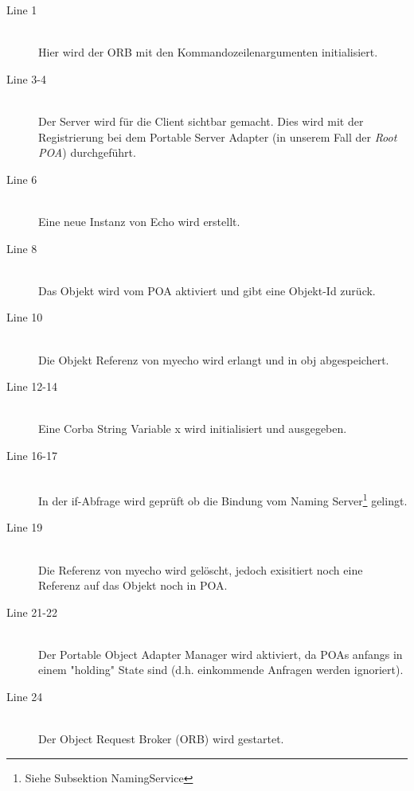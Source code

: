 \documentclass[11pt]{article}
\begin{document}
\begin{description}

\item[Line 1] \hfill \\
Hier wird der ORB mit den Kommandozeilenargumenten initialisiert.

\item[Line 3-4] \hfill \\
Der Server wird für die Client sichtbar gemacht. Dies wird mit der Registrierung bei dem Portable Server Adapter (in unserem Fall der \textit{Root POA}) durchgeführt.

\item[Line 6] \hfill \\
Eine neue Instanz von Echo wird erstellt.

\item[Line 8] \hfill \\
Das Objekt wird vom POA aktiviert und gibt eine Objekt-Id zurück.

\item[Line 10] \hfill \\
Die Objekt Referenz von myecho wird erlangt und in obj abgespeichert.

\item[Line 12-14] \hfill \\
Eine Corba String Variable x wird initialisiert und ausgegeben. 

\item[Line 16-17] \hfill \\
In der if-Abfrage wird geprüft ob die Bindung vom Naming Server\footnote{Siehe Subsektion NamingService} gelingt.

\item[Line 19] \hfill \\
Die Referenz von myecho wird gelöscht, jedoch exisitiert noch eine Referenz auf das Objekt noch in POA.

\item[Line 21-22] \hfill \\
Der Portable Object Adapter Manager wird aktiviert, da POAs anfangs in einem "holding" State sind (d.h. einkommende Anfragen werden ignoriert).

\item[Line 24] \hfill \\
Der Object Request Broker (ORB) wird gestartet.

\end{description}
\end{document}
